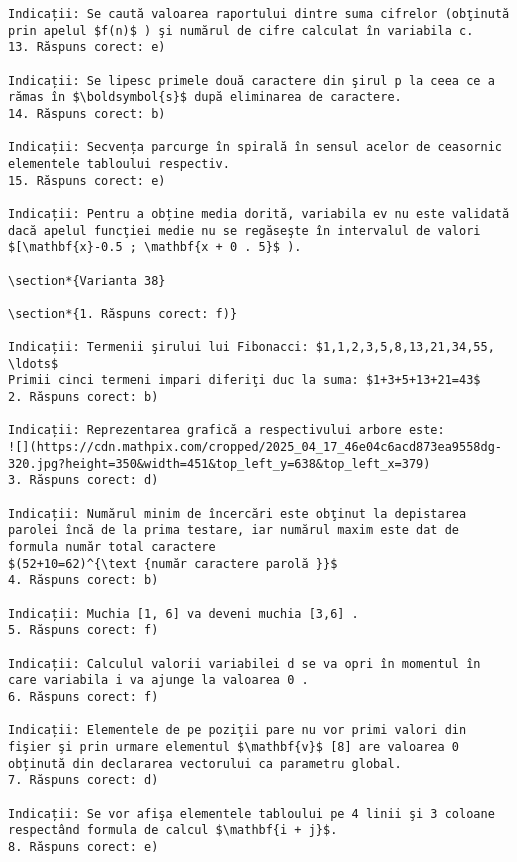 \begin{verbatim}
Indicații: Se caută valoarea raportului dintre suma cifrelor (obţinută prin apelul $f(n)$ ) şi numărul de cifre calculat în variabila c.
13. Răspuns corect: e)

Indicații: Se lipesc primele două caractere din şirul p la ceea ce a rămas în $\boldsymbol{s}$ după eliminarea de caractere.
14. Răspuns corect: b)

Indicații: Secvența parcurge în spirală în sensul acelor de ceasornic elementele tabloului respectiv.
15. Răspuns corect: e)

Indicații: Pentru a obține media dorită, variabila ev nu este validată dacă apelul funcţiei medie nu se regăseşte în intervalul de valori $[\mathbf{x}-0.5 ; \mathbf{x + 0 . 5}$ ).

\section*{Varianta 38}

\section*{1. Răspuns corect: f)}

Indicații: Termenii şirului lui Fibonacci: $1,1,2,3,5,8,13,21,34,55, \ldots$
Primii cinci termeni impari diferiţi duc la suma: $1+3+5+13+21=43$
2. Răspuns corect: b)

Indicații: Reprezentarea grafică a respectivului arbore este:
![](https://cdn.mathpix.com/cropped/2025_04_17_46e04c6acd873ea9558dg-320.jpg?height=350&width=451&top_left_y=638&top_left_x=379)
3. Răspuns corect: d)

Indicații: Numărul minim de încercări este obţinut la depistarea parolei încă de la prima testare, iar numărul maxim este dat de formula număr total caractere
$(52+10=62)^{\text {număr caractere parolă }}$
4. Răspuns corect: b)

Indicații: Muchia [1, 6] va deveni muchia [3,6] .
5. Răspuns corect: f)

Indicații: Calculul valorii variabilei d se va opri în momentul în care variabila i va ajunge la valoarea 0 .
6. Răspuns corect: f)

Indicații: Elementele de pe poziţii pare nu vor primi valori din fişier şi prin urmare elementul $\mathbf{v}$ [8] are valoarea 0 obținută din declararea vectorului ca parametru global.
7. Răspuns corect: d)

Indicații: Se vor afişa elementele tabloului pe 4 linii şi 3 coloane respectând formula de calcul $\mathbf{i + j}$.
8. Răspuns corect: e)


\end{verbatim}
